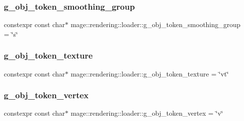 \hypertarget{namespacemage_1_1rendering_1_1loader_aa2511bf7b71b4c38a061e2f5f36bf195}{}\label{namespacemage_1_1rendering_1_1loader_aa2511bf7b71b4c38a061e2f5f36bf195} 
\subsubsection{\texorpdfstring{g\+\_\+obj\+\_\+token\+\_\+smoothing\+\_\+group}{g\_obj\_token\_smoothing\_group}}
{\footnotesize\ttfamily constexpr const char$\ast$ mage\+::rendering\+::loader\+::g\+\_\+obj\+\_\+token\+\_\+smoothing\+\_\+group = \char`\"{}s\char`\"{}}

\hypertarget{namespacemage_1_1rendering_1_1loader_a79a8da6ee8292a1c213462f07face729}{}\label{namespacemage_1_1rendering_1_1loader_a79a8da6ee8292a1c213462f07face729} 
\subsubsection{\texorpdfstring{g\+\_\+obj\+\_\+token\+\_\+texture}{g\_obj\_token\_texture}}
{\footnotesize\ttfamily constexpr const char$\ast$ mage\+::rendering\+::loader\+::g\+\_\+obj\+\_\+token\+\_\+texture = \char`\"{}vt\char`\"{}}

\hypertarget{namespacemage_1_1rendering_1_1loader_a3bc337095a224d230c684052e246766d}{}\label{namespacemage_1_1rendering_1_1loader_a3bc337095a224d230c684052e246766d} 
\subsubsection{\texorpdfstring{g\+\_\+obj\+\_\+token\+\_\+vertex}{g\_obj\_token\_vertex}}
{\footnotesize\ttfamily constexpr const char$\ast$ mage\+::rendering\+::loader\+::g\+\_\+obj\+\_\+token\+\_\+vertex = \char`\"{}v\char`\"{}}

